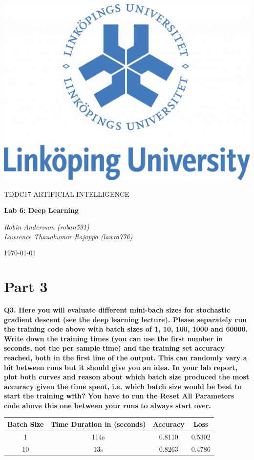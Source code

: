 \documentclass[a4paper,10pt]{article}
\begin{document}
\begin{titlepage}
	\centering
	\includegraphics[width=.6\textwidth]{liu-logo.png}\par
	\vfill
	{\scshape\Large TDDC17 ARTIFICIAL INTELLIGENCE\par}
	{\huge\bfseries Lab 6: Deep Learning\par}
	\vspace{1cm}
	{\large\itshape Robin Andersson (roban591) \\ Lawrence Thanakumar Rajappa (lawra776)\par}
	\vfill
	{\large \today\par}
\end{titlepage}

\section*{Part 3}

\textbf{Q3. Here you will evaluate different mini-bach sizes for stochastic gradient descent (see the deep learning lecture). 
Please separately run the training code above with batch sizes of 1, 10, 100, 1000 and 60000. 
Write down the training times (you can use the first number in seconds, not the per sample time) and 
the training set accuracy reached, both in the first line of the output. 
This can randomly vary a bit between runs but it should give you an idea. 
In your lab report, plot both curves and reason about which batch size produced the most accuracy 
given the time spent, i.e. which batch size would be best to start the training with? 
You have to run the Reset All Parameters code above this one between your runs to always start over.}


\begin{center}
	\begin{tabular}{|c|c|c|c|}
		\hline
		 \textbf{Batch Size} & \textbf{Time Duration in (seconds)} & \textbf{Accuracy} &\textbf{Loss}\\ [0.5ex]
		\hline
		1 & 114s &0.8110 &0.5302\\
		\hline
		10 & 13s &0.8263 &0.4786\\
		\hline
	\end{tabular}
\end{center}
\end{document}
